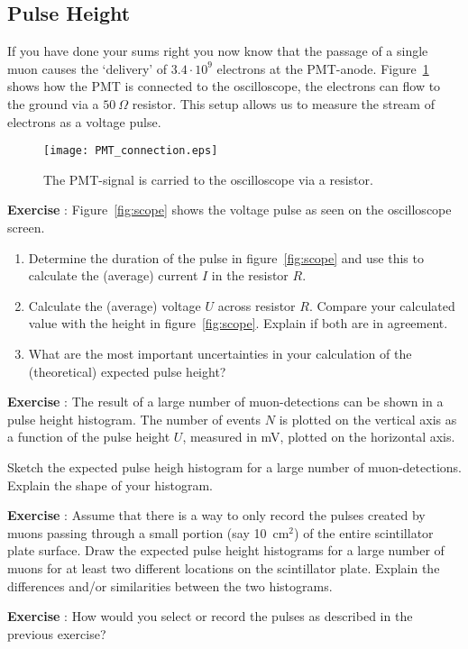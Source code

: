 \subsection{Pulse Height}
If you have done your sums right you now know that the passage of a single muon causes the `delivery' of $3.4 \cdot 10^9$ electrons at the PMT-anode. Figure~\ref{fig:PMT_connection} shows how the PMT is connected to the oscilloscope, the electrons can flow to the ground via a $50~\Omega$ resistor. This setup allows us to measure the stream of electrons as a voltage pulse.

\begin{figure}\begin{center}
\texttt{[image: PMT\_connection.eps]}%
\caption{The PMT-signal is carried to the oscilloscope via a resistor. }\label{fig:PMT_connection}
\end{center}\end{figure}

\begin{shaded}
\textbf{Exercise \theExercise {}} : Figure~\ref{fig:scope} shows the voltage pulse as seen on the oscilloscope screen.
\begin{enumerate}[-]
\item Determine the duration of the pulse in figure~\ref{fig:scope} and use this to calculate the (average) current $I$ in the resistor $R$.
\item Calculate the (average) voltage $U$ across resistor $R$. Compare your calculated value with the height in figure~\ref{fig:scope}. Explain if both are in agreement.
\item What are the most important uncertainties in your calculation of the (theoretical) expected pulse height?
\end{enumerate}
\end{shaded}

\begin{shaded}
\textbf{Exercise \theExercise {}} : The result of a large number of muon-detections can be shown in a pulse height histogram. The number of events $N$ is plotted on the vertical axis as a function of the pulse height $U$, measured in mV, plotted on the horizontal axis.

Sketch the expected pulse heigh histogram for a large number of muon-detections. Explain the shape of your histogram.
\end{shaded}

\begin{shaded}
\textbf{Exercise \theExercise {}} : Assume that there is a way to only record the pulses created by muons passing through a small portion (say 10~cm$^2$) of the entire scintillator plate surface. Draw the expected pulse height histograms for a large number of muons for at least two different locations on the scintillator plate. Explain the differences and/or similarities between the two histograms.\end{shaded}

\begin{shaded}
\textbf{Exercise \theExercise {}} : How would you select or record the pulses as described in the previous exercise?\end{shaded}



